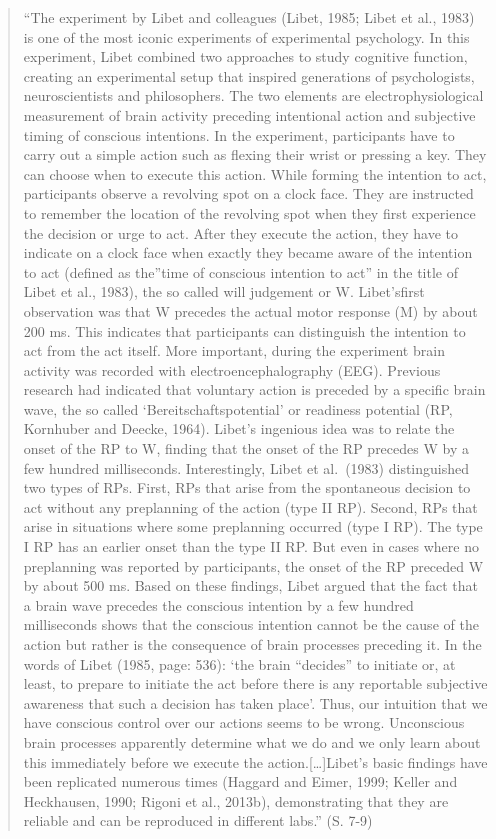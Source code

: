 \documentclass[
  a4paper,
]{report}
\begin{document}
\begin{quote}
``The experiment by Libet and colleagues (Libet, 1985; Libet et al., 1983) is one of the most iconic experiments of experimental psychology. In this experiment, Libet combined two approaches to study cognitive function, creating an experimental setup that inspired generations of psychologists, neuroscientists and philosophers. The two elements are electrophysiological measurement of brain activity preceding intentional action and subjective timing of conscious intentions. In the experiment, participants have to carry out a simple action such as flexing their wrist or pressing a key. They can choose when to execute this action. While forming the intention to act, participants observe a revolving spot on a clock face. They are instructed to remember the location of the revolving spot when they first experience the decision or urge to act. After they execute the action, they have to indicate on a clock face when exactly they became aware of the intention to act (defined as the''time of conscious intention to act'' in the title of Libet et al., 1983), the so called will judgement or W. Libet'sfirst observation was that W precedes the actual motor response (M) by about 200 ms. This indicates that participants can distinguish the intention to act from the act itself. More important, during the experiment brain activity was recorded with electroencephalography (EEG). Previous research had indicated that voluntary action is preceded by a specific brain wave, the so called `Bereitschaftspotential' or readiness potential (RP, Kornhuber and Deecke, 1964). Libet's ingenious idea was to relate the onset of the RP to W, finding that the onset of the RP precedes W by a few hundred milliseconds. Interestingly, Libet et al.~(1983) distinguished two types of RPs. First, RPs that arise from the spontaneous decision to act without any preplanning of the action (type II RP). Second, RPs that arise in situations where some preplanning occurred (type I RP). The type I RP has an earlier onset than the type II RP. But even in cases where no preplanning was reported by participants, the onset of the RP preceded W by about 500 ms. Based on these findings, Libet argued that the fact that a brain wave precedes the conscious intention by a few hundred milliseconds shows that the conscious intention cannot be the cause of the action but rather is the consequence of brain processes preceding it. In the words of Libet (1985, page: 536): `the brain ``decides'' to initiate or, at least, to prepare to initiate the act before there is any reportable subjective awareness that such a decision has taken place'. Thus, our intuition that we have conscious control over our actions seems to be wrong. Unconscious brain processes apparently determine what we do and we only learn about this immediately before we execute the action.{[}\ldots{]}Libet's basic findings have been replicated numerous times (Haggard and Eimer, 1999; Keller and Heckhausen, 1990; Rigoni et al., 2013b), demonstrating that they are reliable and can be reproduced in different labs.'' (S. 7-9)
\end{quote}
\end{document}
